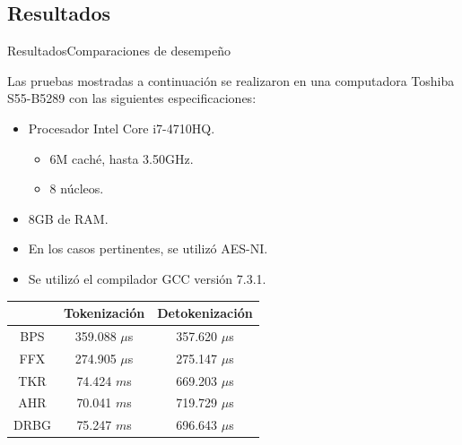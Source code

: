 %
%
%

\subsection{Resultados}

\begin{frame}{Resultados}{Comparaciones de desempeño}
  {
    Las pruebas mostradas a continuación se realizaron en una computadora
    Toshiba S55-B5289 con las siguientes especificaciones:
    \begin{itemize}
      \item Procesador Intel Core i7-4710HQ.
      \begin{itemize}
        \item 6M caché, hasta 3.50GHz.
        \item 8 núcleos.
      \end{itemize}
      \item 8GB de RAM.
      \item En los casos pertinentes, se utilizó AES-NI\footnotemark.
      \item Se utilizó el compilador GCC versión 7.3.1.
    \end{itemize}
  }
  {
    {\small
      \begin{table}
        \begin{center}
          \begin{tabular}{c|c|c|}
            \cline{2-3}
            & Tokenización & Detokenización \\
            \hline
            \multicolumn{1}{|c|}{BPS}
              & 359.088   $\mu$s & 357.620 $\mu$s   \\\hline
            \multicolumn{1}{|c|}{FFX}
              & 274.905   $\mu$s & 275.147 $\mu$s   \\\hline

            \multicolumn{1}{|c|}{TKR}
              & 74.424  $m$s & 669.203 $\mu$s   \\\hline
            \multicolumn{1}{|c|}{AHR}
              & 70.041  $m$s & 719.729 $\mu$s   \\\hline
            \multicolumn{1}{|c|}{DRBG}
              & 75.247  $m$s & 696.643 $\mu$s  \\\hline
          \end{tabular}


\end{center}
\end{table}}}
\end{frame}
